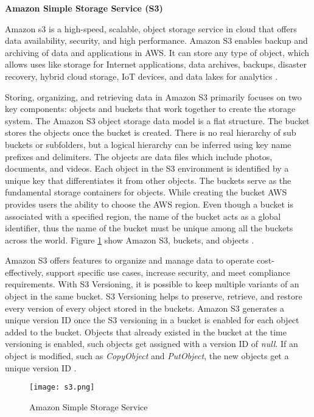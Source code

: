 \clearpage
\textbf{Amazon Simple Storage Service (S3)}

\par Amazon \gls{s3} is a high-speed, scalable, object
storage
service
in cloud that offers data availability, security, and
high performance.
Amazon S3 enables backup and archiving of data and
applications in AWS. It can store any type of object,
which allows uses like storage for Internet applications, data archives, backups, disaster recovery, hybrid cloud storage, IoT devices, and data lakes for analytics \cite{39}.

\par Storing, organizing, and retrieving data in Amazon S3 primarily focuses on two key components: objects and buckets that work together to create the storage system.
The Amazon S3 object storage data model is a flat structure.
The bucket stores the objects once the bucket is created.
There is no real hierarchy of sub buckets or subfolders,
but a logical hierarchy can be inferred using key name prefixes and delimiters.
The objects are data files which include photos,
documents, and videos.
Each object in the S3 environment
is identified by a unique key that differentiates it from other objects.
The buckets serve as the fundamental storage containers for objects.
While creating the bucket AWS provides users the ability to choose the AWS region.
Even though a bucket is associated with a specified region, the name of the bucket acts as a global identifier, thus the name of the bucket must be unique among all the buckets across the world.
Figure \ref{fig:s3} show Amazon S3, buckets, and objects
\cite{40}.

\par Amazon S3 offers features to organize and manage data to operate cost-effectively, support specific use cases,
increase security, and meet compliance requirements.
With S3 Versioning, it is possible to keep multiple variants of an object in the same bucket.
S3 Versioning helps to preserve, retrieve, and restore every version of every object stored in the buckets.
Amazon S3 generates a unique version ID once the S3 versioning in a bucket is enabled for each object added to the bucket.
Objects that already existed in the bucket at the time
versioning is enabled, such objects get assigned with a
version ID of \textit{null}. If an object is modified, such as \textit{CopyObject} and \textit{PutObject}, the new objects get a unique version ID \cite{41}.

\begin{figure}
    \centering
    \texttt{[image: s3.png]}
    \caption{Amazon Simple Storage Service}{\cite{42}}
    \label{fig:s3}
\end{figure}

